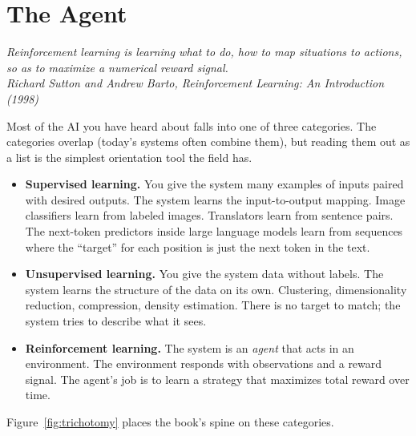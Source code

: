 \chapter{The Agent}

\vspace{1em}
\hfill
\begin{minipage}[c]{0.55\textwidth}
\raggedleft
\small\itshape
Reinforcement learning is learning what to do, how to map situations to actions, so as to maximize a numerical reward signal.\\[0.5em]
\upshape\footnotesize Richard Sutton and Andrew Barto, \textit{Reinforcement Learning: An Introduction} (1998)
\end{minipage}%
\hspace{0.5em}
\begin{minipage}[c]{0.12\textwidth}
\end{minipage}
\vspace{1.5em}

\noindent Most of the AI you have heard about falls into one of three categories. The categories overlap (today's systems often combine them), but reading them out as a list is the simplest orientation tool the field has.

\begin{itemize}
\item \textbf{Supervised learning.} You give the system many examples of inputs paired with desired outputs. The system learns the input-to-output mapping. Image classifiers learn from labeled images. Translators learn from sentence pairs. The next-token predictors inside large language models learn from sequences where the ``target'' for each position is just the next token in the text.

\item \textbf{Unsupervised learning.} You give the system data without labels. The system learns the structure of the data on its own. Clustering, dimensionality reduction, compression, density estimation. There is no target to match; the system tries to describe what it sees.

\item \textbf{Reinforcement learning.} The system is an \emph{agent} that acts in an environment. The environment responds with observations and a reward signal. The agent's job is to learn a strategy that maximizes total reward over time.
\end{itemize}

Figure~\ref{fig:trichotomy} places the book's spine on these categories.

